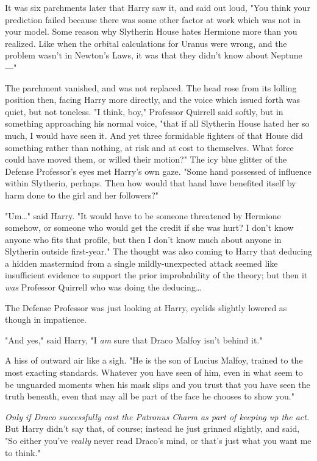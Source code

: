 It was six parchments later that Harry saw it, and said out loud, "You think 
your prediction failed because there was some other factor at work which was 
not in your model. Some reason why Slytherin House hates Hermione more than you 
realized. Like when the orbital calculations for Uranus were wrong, and the 
problem wasn't in Newton's Laws, it was that they didn't know about Neptune---"

The parchment vanished, and was not replaced. The head rose from its lolling 
position then, facing Harry more directly, and the voice which issued forth was 
quiet, but not toneless. "I think, boy," Professor Quirrell said softly, but in 
something approaching his normal voice, "that if all Slytherin House hated her 
so much, I would have seen it. And yet three formidable fighters of that House 
did something rather than nothing, at risk and at cost to themselves. What 
force could have moved them, or willed their motion?" The icy blue glitter of 
the Defense Professor's eyes met Harry's own gaze. "Some hand possessed of 
influence within Slytherin, perhaps. Then how would that hand have benefited 
itself by harm done to the girl and her followers?"

"Um{\ldots}" said Harry. "It would have to be someone threatened by Hermione 
somehow, or someone who would get the credit if she was hurt? I don't know 
anyone who fits that profile, but then I don't know much about anyone in 
Slytherin outside first-year." The thought was also coming to Harry that 
deducing a hidden mastermind from a single mildly-unexpected attack seemed like 
insufficient evidence to support the prior improbability of the theory; but 
then it \emph{was} Professor Quirrell who was doing the deducing{\ldots}

The Defense Professor was just looking at Harry, eyelids slightly lowered as 
though in impatience.

"And yes," said Harry, "I \emph{am} sure that Draco Malfoy isn't behind it."

A hiss of outward air like a sigh. "He is the son of Lucius Malfoy, trained to 
the most exacting standards. Whatever you have seen of him, even in what seem 
to be unguarded moments when his mask slips and you trust that you have seen 
the truth beneath, even that may all be part of the face he chooses to show 
you."

\emph{Only if Draco successfully cast the Patronus Charm as part of keeping up 
the act.} But Harry didn't say that, of course; instead he just grinned 
slightly, and said, "So either you've \emph{really} never read Draco's mind, or 
that's just what you want me to think."

